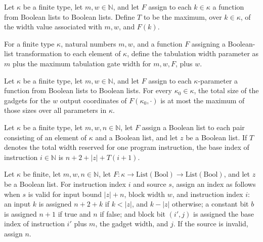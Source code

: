 \begin{definition}
\label{BoolCircuit.tabG}
\leanok
{}
Let $\kappa$ be a finite type, let $m,w\in\mathbb{N}$, and let $F$ assign to each
$k\in\kappa$ a function from Boolean lists to Boolean lists. Define $T$ to be the
maximum, over $k\in\kappa$, of the width value associated with $m,w$, and $F(k)$.
\end{definition}

\begin{definition}
\label{BoolCircuit.tabW}
\leanok
{}
For a finite type $\kappa$, natural numbers $m,w$, and a function $F$ assigning a
Boolean-list transformation to each element of $\kappa$, define the tabulation width
parameter as $m$ plus the maximum tabulation gate width for $m,w,F$, plus $w$.
\end{definition}

\begin{theorem}
\label{BoolCircuit.kindWidth_le_tabG}
\leanok
{}
Let $\kappa$ be a finite type, let $m,w\in\mathbb{N}$, and let $F$ assign to each
$\kappa$-parameter a function from Boolean lists to Boolean lists. For every
$\kappa_0\in\kappa$, the total size of the gadgets for the $w$ output coordinates of
$F(\kappa_0,\cdot)$ is at most the maximum of those sizes over all parameters in
$\kappa$.
\end{theorem}

\begin{definition}
\label{BoolCircuit.tabBase}
\leanok
{}
Let $\kappa$ be a finite type, let $m,w,n\in\mathbb{N}$, let $F$ assign a Boolean list
to each pair consisting of an element of $\kappa$ and a Boolean list, and let $z$ be a
Boolean list. If $T$ denotes the total width reserved for one program instruction, the
base index of instruction $i\in\mathbb{N}$ is $n+2+|z|+T(i+1)$.
\end{definition}

\begin{definition}
\label{BoolCircuit.tabSrc}
\leanok
{}
Let $\kappa$ be finite, let $m,w,n\in\mathbb{N}$, let
$F:\kappa\to\mathrm{List}(\mathrm{Bool})\to\mathrm{List}(\mathrm{Bool})$, and let $z$ be
a Boolean list. For instruction index $i$ and source $s$, assign an index as follows
when $s$ is valid for input bound $|z|+n$, block width $w$, and instruction index $i$:
an input $k$ is assigned $n+2+k$ if $k<|z|$, and $k-|z|$ otherwise; a constant bit $b$
is assigned $n+1$ if true and $n$ if false; and block bit $(i',j)$ is assigned the base
index of instruction $i'$ plus $m$, the gadget width, and $j$. If the source is invalid,
assign $n$.
\end{definition}

